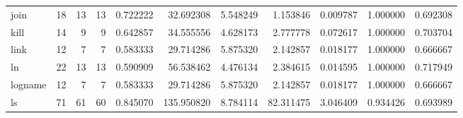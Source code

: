 \begin{longtable}{lrrrrrrrrrr}
join      &                                      18 &                 13 &                                13 &                                   0.722222 &                              32.692308 &                                     5.548249 &                          1.153846 &                                0.009787 &                           1.000000 &                                           0.692308 \\
kill      &                                      14 &                  9 &                                 9 &                                   0.642857 &                              34.555556 &                                     4.628173 &                          2.777778 &                                0.072617 &                           1.000000 &                                           0.703704 \\
link      &                                      12 &                  7 &                                 7 &                                   0.583333 &                              29.714286 &                                     5.875320 &                          2.142857 &                                0.018177 &                           1.000000 &                                           0.666667 \\
ln        &                                      22 &                 13 &                                13 &                                   0.590909 &                              56.538462 &                                     4.476134 &                          2.384615 &                                0.014595 &                           1.000000 &                                           0.717949 \\
logname   &                                      12 &                  7 &                                 7 &                                   0.583333 &                              29.714286 &                                     5.875320 &                          2.142857 &                                0.018177 &                           1.000000 &                                           0.666667 \\
ls        &                                      71 &                 61 &                                60 &                                   0.845070 &                             135.950820 &                                     8.784114 &                         82.311475 &                                3.046409 &                           0.934426 &                                           0.693989 \\

\end{longtable}
